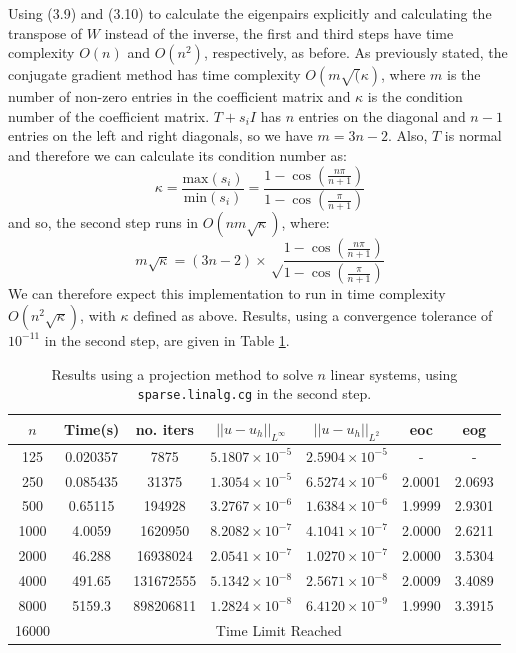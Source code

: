 \documentclass[11pt]{article}
\numberwithin{equation}{section}
\begin{document}
Using (3.9) and (3.10) to calculate the eigenpairs explicitly and calculating the transpose of $W$ instead of the inverse, the first and third steps have time complexity $O(n)$ and $O(n^2)$, respectively, as before. As previously stated, the conjugate gradient method has time complexity $O(m\sqrt(\kappa)$, where $m$ is the number of non-zero entries in the coefficient matrix and $\kappa$ is the condition number of the coefficient matrix. $T+s_i I$ has $n$ entries on the diagonal and $n-1$ entries on the left and right diagonals, so we have $m=3n-2$. Also, $T$ is normal and therefore we can calculate its condition number as:
\begin{equation}
\kappa = \frac{\text{max}(s_i)}{\text{min}(s_i)} = \frac{1-\cos \left(\frac{n \pi}{n+1} \right)}{1-\cos \left(\frac{\pi}{n+1} \right)}
\end{equation}
and so, the second step runs in $O(n m\sqrt{\kappa})$, where:
\begin{equation}
m\sqrt{\kappa} = (3n-2) \times \sqrt \frac{1-\cos \left(\frac{n \pi}{n+1} \right)}{1-\cos \left(\frac{\pi}{n+1} \right)}
\end{equation}
We can therefore expect this implementation to run in time complexity $O(n^2 \sqrt{\kappa})$, with $\kappa$ defined as above. Results, using a convergence tolerance of $10^{-11}$ in the second step, are given in Table \ref{table:shifted it}. 

\begin{table}[H]
\centering
\begin{tabular}{|c|c|c|c|c|c|c|}
\hline
$n$ & Time(s) & no. iters & $|| u - u_h ||_{L^{\infty}}$ &$|| u - u_h ||_{L^{2}}$ & eoc & eog \\
\hline
125 & 0.020357 & 7875 & $5.1807 \times 10^{-5}$ & $2.5904 \times 10^{-5}$ & - & - \\
250 & 0.085435 & 31375 & $1.3054 \times 10^{-5}$ & $6.5274 \times 10^{-6}$ & 2.0001  & 2.0693 \\
500 & 0.65115 & 194928 & $3.2767 \times 10^{-6}$ & $1.6384 \times 10^{-6}$ & 1.9999  & 2.9301 \\
1000 & 4.0059 & 1620950 & $8.2082 \times 10^{-7}$ & $4.1041 \times 10^{-7}$ & 2.0000 & 2.6211 \\
2000 & 46.288 & 16938024 & $2.0541 \times 10^{-7}$ & $1.0270 \times 10^{-7}$ & 2.0000 & 3.5304 \\
4000 & 491.65 & 131672555 & $5.1342 \times 10^{-8}$ & $2.5671 \times 10^{-8}$ & 2.0009 &  3.4089 \\
8000 & 5159.3 & 898206811 & $1.2824 \times 10^{-8}$ & $6.4120 \times 10^{-9}$ & 1.9990 & 3.3915 \\
\cline{2-7} 
16000 & \multicolumn{6}{c|}{Time Limit Reached} \\
\hline
\end{tabular}
\captionsetup{justification=centering}
\caption{Results using a projection method to solve $n$ linear systems, using \texttt{sparse.linalg.cg} in the second step.}
\label{table:shifted it}
\end{table}
\end{document}

